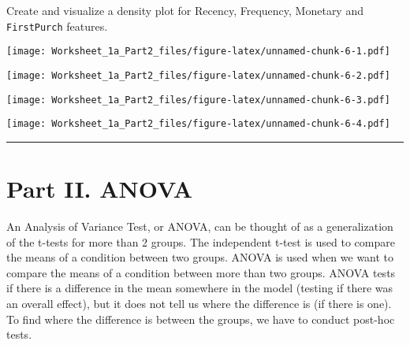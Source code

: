 \documentclass[
]{article}
\newenvironment{Shaded}{\begin{snugshade}}{\end{snugshade}}
\newcommand{\FunctionTok}[1]{\textcolor[rgb]{0.00,0.00,0.00}{#1}}
\newcommand{\NormalTok}[1]{#1}
\newcommand{\SpecialCharTok}[1]{\textcolor[rgb]{0.00,0.00,0.00}{#1}}
\begin{document}
Create and visualize a density plot for Recency, Frequency, Monetary and
\texttt{FirstPurch} features.

\begin{Shaded}
\end{Shaded}

\texttt{[image: Worksheet\_1a\_Part2\_files/figure-latex/unnamed-chunk-6-1.pdf]}

\begin{Shaded}
\end{Shaded}

\texttt{[image: Worksheet\_1a\_Part2\_files/figure-latex/unnamed-chunk-6-2.pdf]}

\begin{Shaded}
\end{Shaded}

\texttt{[image: Worksheet\_1a\_Part2\_files/figure-latex/unnamed-chunk-6-3.pdf]}

\begin{Shaded}
\end{Shaded}

\texttt{[image: Worksheet\_1a\_Part2\_files/figure-latex/unnamed-chunk-6-4.pdf]}

\begin{center}\rule{0.5\linewidth}{0.5pt}\end{center}

\hypertarget{part-ii.-anova}{%
\section{Part II. ANOVA}\label{part-ii.-anova}}

An Analysis of Variance Test, or ANOVA, can be thought of as a
generalization of the t-tests for more than 2 groups. The independent
t-test is used to compare the means of a condition between two groups.
ANOVA is used when we want to compare the means of a condition between
more than two groups. ANOVA tests if there is a difference in the mean
somewhere in the model (testing if there was an overall effect), but it
does not tell us where the difference is (if there is one). To find
where the difference is between the groups, we have to conduct post-hoc
tests.
\end{document}
